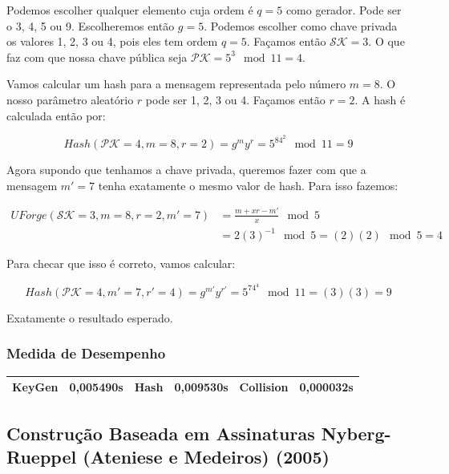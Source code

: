 \documentclass[a4paper]{article}
\begin{document}
    Podemos escolher qualquer elemento cuja ordem é $q=5$ como
    gerador. Pode ser o 3, 4, 5 ou 9. Escolheremos então $g=5$. Podemos
    escolher como chave privada os valores 1, 2, 3 ou 4, pois eles tem
    ordem $q=5$. Façamos então $\mathcal{SK}=3$. O que faz com que nossa
    chave pública seja $\mathcal{PK}=5^3\mod 11 = 4$.
    
    Vamos calcular um hash para a mensagem representada pelo número
    $m=8$. O nosso parâmetro aleatório $r$ pode ser 1, 2, 3 ou 4. Façamos
    então $r=2$. A hash é calculada então por:
    
    $$
    Hash(\mathcal{PK}=4, m=8, r=2) = g^my^r = 5^84^2 \mod 11 = 9
    $$
    
    Agora supondo que tenhamos a chave privada, queremos fazer com que a
    mensagem $m'=7$ tenha exatamente o mesmo valor de hash. Para isso
    fazemos:
    
    \begin{equation}
    \begin{split}
      UForge(\mathcal{SK}=3, m=8, r=2, m'=7) &= \frac{m+xr-m'}{x} \mod 5\\
      &= 2(3)^{-1} \mod 5 = (2)(2) \mod 5 = 4
    \end{split}
    \end{equation}
    
    Para checar que isso é correto, vamos calcular:
    
    $$ Hash(\mathcal{PK}=4, m'=7, r'=4) = g^{m'}y^{r'} = 5^74^4 \mod 11 =
    (3)(3)= 9
    $$
    
    Exatamente o resultado esperado.
    
    \subsubsection{Medida de Desempenho}
    
    \begin{center}
    \begin{tabular}{|c|c|c|c|c|c|}
      \hline
      KeyGen & 0,005490s & Hash & 0,009530s & Collision & 0,000032s\\
      \hline
    \end{tabular}
    \end{center}
    
    \subsection{Construção Baseada em Assinaturas  Nyberg-Rueppel
      (Ateniese e Medeiros) (2005)\cite{ateniese}}
    
\end{document}
